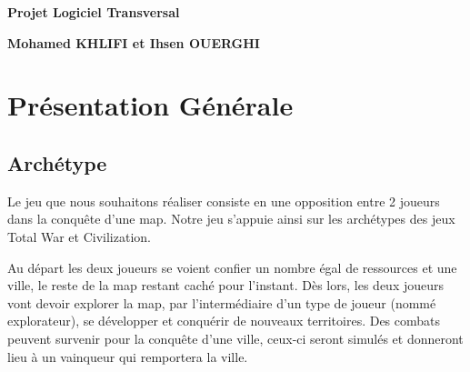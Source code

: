 \documentclass[a4paper,12pt]{article}
\begin{document}
\thispagestyle{empty}

\begin{titlepage}

\vspace*{2cm}

\begin{center}\textbf{\Huge Projet Logiciel Transversal}\end{center}{\Large \par}

\begin{center}\textbf{\large Mohamed KHLIFI et Ihsen OUERGHI}\end{center}{\large \par}

\vspace{2cm}


\clearpage

{\small
\tableofcontents
}

\end{titlepage}

\clearpage
\section{Présentation Générale}

\subsection{Archétype}

\vspace{1\baselineskip}


Le jeu que  nous souhaitons réaliser consiste en une opposition entre 2 joueurs dans la conquête d’une map. Notre jeu s’appuie ainsi sur les archétypes des jeux Total War et Civilization. 

Au départ les deux joueurs se voient confier un nombre égal de ressources et une ville, le reste de la map restant caché pour l'instant. Dès lors, les deux joueurs vont devoir explorer la map, par l'intermédiaire d'un type de joueur (nommé explorateur), se développer et conquérir de nouveaux territoires. Des combats peuvent survenir pour la conquête d'une ville, ceux-ci seront simulés et donneront lieu à un vainqueur qui remportera la ville.
\end{document}
